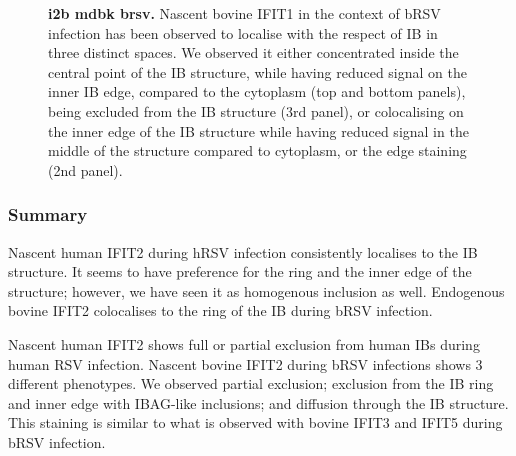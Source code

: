\begin{figure}
\begin{subfigure}{1\textwidth}
    \end{subfigure}
    \caption[i2b mdbk brsv]{\textbf{i2b mdbk brsv.} Nascent bovine IFIT1 in the context of bRSV infection has been observed to localise with the respect of IB in three distinct spaces. We observed it either concentrated inside the central point of the IB structure, while having reduced signal on the inner IB edge, compared to the cytoplasm (top and bottom panels), being excluded from the IB structure (3rd panel), or colocalising on the inner edge of the IB structure while having reduced signal in the middle of the structure compared to cytoplasm, or the edge staining (2nd panel).}
    \label{fig:i2b mdbk brsv}
\end{figure}

\subsubsection{Summary} \label{Summary-i2-infection}
Nascent human IFIT2 during hRSV infection consistently localises to the IB structure. It seems to have preference for the ring and the inner edge of the structure; however, we have seen it as homogenous inclusion as well. Endogenous bovine IFIT2 colocalises to the ring of the IB during bRSV infection.

Nascent human IFIT2 shows full or partial exclusion from human IBs during human RSV infection. Nascent bovine IFIT2 during bRSV infections shows 3 different phenotypes. We observed partial exclusion; exclusion from the IB ring and inner edge with IBAG-like inclusions; and diffusion through the IB structure. This staining is similar to what is observed with bovine IFIT3 and IFIT5 during bRSV infection.